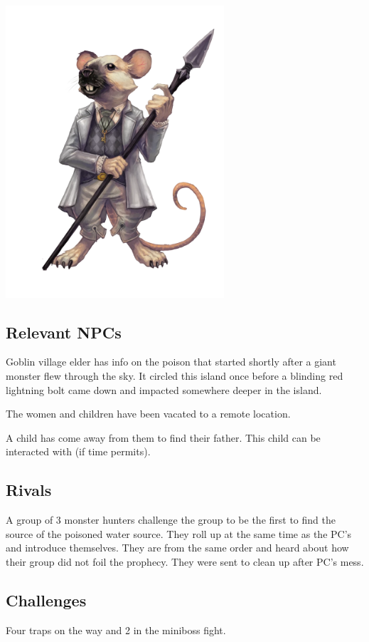 \begin{multicols}{2}
  \begin{minipage}[t]{.15\textwidth}
    \includegraphics[width=3.2in]{book/img/Swarm_Voice}
  \end{minipage}

  \subsection{Relevant NPCs}
  Goblin village elder has info on the poison that started shortly after a giant monster flew through the sky. It circled this island once before a blinding red lightning bolt came down and impacted somewhere deeper in the island.

  The women and children have been vacated to a remote location.

  A child has come away from them to find their father. This child can be interacted with (if time permits).

  \subsection{Rivals}
  A group of 3 monster hunters challenge the group to be the first to find the source of the poisoned water source. They roll up at the same time as the PC's and introduce themselves. They are from the same order and heard about how their group did not foil the prophecy. They were sent to clean up after PC's mess.

  \subsection{Challenges}
  Four traps on the way and 2 in the miniboss fight.


\end{multicols}
